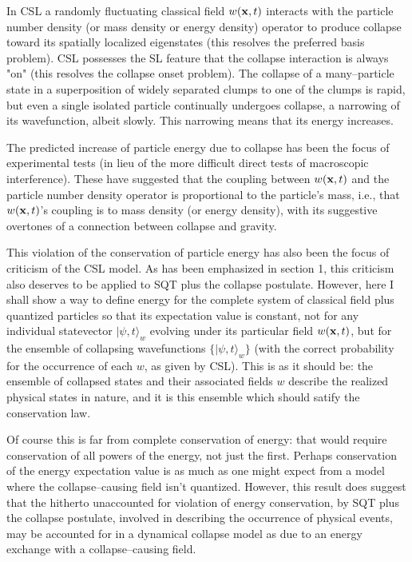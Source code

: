 \documentclass[12pt]{article}
\begin{document}
	In CSL a randomly fluctuating classical field $w({\bf x},t)$ interacts with the 
particle number density (or mass density or energy density) operator 
to produce collapse toward its spatially localized eigenstates (this resolves the 
preferred basis problem).  CSL possesses the SL feature that the collapse 
interaction is always "on" (this resolves the collapse onset problem). The collapse 
of a many--particle state in a superposition of widely separated clumps to one of 
the clumps is rapid, but even a single isolated particle continually undergoes collapse, 
a narrowing of its wavefunction, albeit slowly.  This narrowing means that its 
energy increases.  

	The predicted increase of particle energy due to collapse has been the 
focus of experimental tests\cite{PearleSquires1,Collett,Ring} (in lieu 
of the more difficult direct tests of macroscopic 
interference\cite{PearleZ,Leggett,Clauser}).  These have suggested that 
the coupling between $w({\bf x},t)$ and the particle number density 
operator is proportional to the particle's mass, i.e., that $w({\bf x},t)$'s coupling is to mass density 
(or energy density), with its suggestive overtones of a connection 
between collapse and gravity\cite{Karolyhazy,Penrose,Diosi,GGR,PearleSquires2}.

	This violation of the conservation of particle energy has also been the
focus of criticism of the CSL model\cite{Ballentine, Anandan}. 
As has been emphasized in section 1, this criticism also deserves to 
be applied to SQT plus the collapse postulate.  However, here 
I shall show a way to define energy for the complete system of classical field plus quantized particles 
so that its expectation value is constant, not for 
any individual statevector $|\psi,t\rangle_w$ 
evolving under its particular field $w({\bf x},t)$, but  
for the ensemble of collapsing wavefunctions $\{ |\psi,t\rangle_w\}$ (with the correct 
probability for the occurrence of each $w$, as given by CSL).  This 
is as it should be: the ensemble of collapsed states and their associated fields  
$w$ describe the realized physical states in nature, 
and it is this ensemble which should satify the conservation law.
   
	Of course this is far from complete conservation of energy: that 
would require conservation of all powers of the energy, not just the first.  Perhaps 
conservation of the energy expectation value is as much as one might expect 
from a model where the collapse--causing field isn't quantized.  However, 
this result does suggest that the hitherto unaccounted for 
violation of energy conservation, by SQT plus the collapse postulate,  
involved in describing the occurrence of physical events,  
may be accounted for in a dynamical collapse model as due to 
an energy exchange with a collapse--causing field.
  
\end{document}
